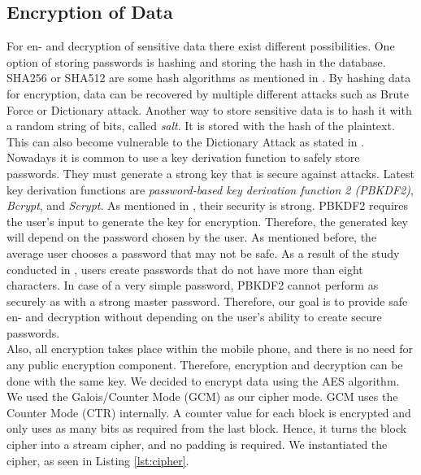 
\subsection{Encryption of Data}\label{arch_encryption}
For en- and decryption of sensitive data there exist different possibilities. One option of storing passwords is hashing and storing the hash in the database. SHA256 or SHA512 are some hash algorithms as mentioned in \cite{ertaul2016implementation}. By hashing data for encryption, data can be recovered by multiple different attacks such as Brute Force or Dictionary attack.
Another way to store sensitive data is to hash it with a random string of bits, called \textit{salt}. It is stored with the hash of the plaintext. This can also become vulnerable to the Dictionary Attack as stated in \cite{3wrongways}. \\
Nowadays it is common to use a key derivation function to safely store passwords. They must generate a strong key that is secure against attacks. Latest key derivation functions are \textit{password-based key derivation function 2 (PBKDF2)}, \textit{Bcrypt}, and \textit{Scrypt}. As mentioned in \cite{ertaul2016implementation}, their security is strong.
PBKDF2 requires the user's input to generate the key for encryption. Therefore, the generated key will depend on the password chosen by the user. \cite{Agilebits} As mentioned before, the average user chooses a password that may not be safe. As a result of the study conducted in \cite{DBLP:journals/ieeesp/YanBAG04}, users create passwords that do not have more than eight characters. In case of a very simple password, PBKDF2 cannot perform as securely as with a strong master password. \cite{3wrongways} Therefore, our goal is to provide safe en- and decryption without depending on the user's ability to create secure passwords. \\

Also, all encryption takes place within the mobile phone, and there is no need for any public encryption component. Therefore, encryption and decryption can be done with the same key. \cite{DBLP:journals/ijnsec/ElminaamKH10} We decided to encrypt data using the AES algorithm. We used the Galois/Counter Mode (GCM) as our cipher mode. GCM uses the Counter Mode (CTR) internally. \cite{AESJavaAndroid} A counter value for each block is encrypted and only uses as many bits as required from the last block. Hence, it turns the block cipher into a stream cipher, and no padding is required. \cite{IVtransmission}
We instantiated the cipher, as seen in Listing \ref{lst:cipher}.

